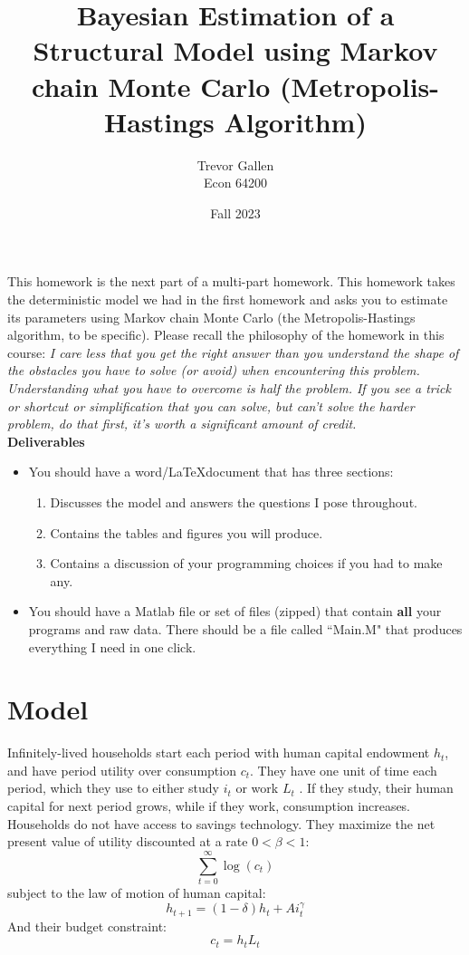 \documentclass[11pt]{article}
\title{Bayesian Estimation of a Structural Model using Markov chain Monte Carlo (Metropolis-Hastings Algorithm)  }
\author{ Trevor Gallen \\ Econ 64200 }
\date{Fall 2023}
\begin{document}


\maketitle

This homework is the next part of a multi-part homework.  This homework takes the deterministic model we had in the first homework and asks you to estimate its parameters using Markov chain Monte Carlo (the Metropolis-Hastings algorithm, to be specific).  Please recall the philosophy of the homework in this course:  \emph{I care less that you get the right answer than you understand the shape of the obstacles you have to solve (or avoid) when encountering this problem.  Understanding what you have to overcome is half the problem.  If you see a trick or shortcut or simplification that you can solve, but can't solve the harder problem, do that first, it's worth a significant amount of credit.}\\

\textbf{Deliverables}
\begin{itemize}
\item You should have a word/\LaTeX document that has three sections: 
\begin{enumerate}
\item Discusses the model and answers the questions I pose throughout.
\item Contains the tables and figures you will produce.
\item Contains a discussion of your programming choices if you had to make any.
\end{enumerate}
\item You should have a Matlab file or set of files (zipped) that contain \textbf{all} your programs and raw data.  There should be a file called ``Main.M" that produces everything I need in one click.
\end{itemize}


\section{Model}
Infinitely-lived households start each period with human capital endowment $h_t$, and have period utility over consumption $c_t$.  They have one unit of time each period, which they use to either study $i_t$ or work $L_t$ . If they study, their human capital for next period grows, while if they work, consumption increases.  Households do not have access to savings technology.  They maximize the net present value of utility discounted at a rate $0<\beta<1$:
$$\sum_{t=0}^\infty \log(c_t)$$
subject to the law of motion of human capital:
$$h_{t+1}=(1-\delta)h_t+Ai_t^\gamma$$
And their budget constraint:
$$c_t=h_tL_t$$
\ \\
\ \\
\end{document}
